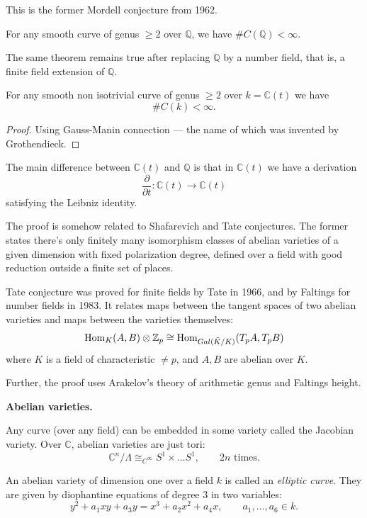 \noindent
This is the former Mordell conjecture
from 1962.

\begin{theorem}[Faltings, 1983]
For any smooth curve of genus $\geq 2$ over
$\mathbb{Q}$, we have $\#C(\mathbb{Q})<
\infty$.
\end{theorem}

The same theorem remains true after
replacing $\mathbb{Q}$ by a number field,
that is, a finite field extension of
$\mathbb{Q}$.

\begin{theorem}
\label{theorem-manin-grauer}
For any smooth non isotrivial curve of
genus $\geq 2$ over $k=\mathbb{C}(t)$
we have
$$
\# C(k) < \infty.
$$
\end{theorem}

\begin{proof}
Using Gauss-Manin connection ---
the name of which was invented by 
Grothendieck.
\end{proof}

\noindent
The main difference between
$\mathbb{C}(t)$
and $\mathbb{Q}$
is that in $\mathbb{C}(t)$
we have a derivation
$$
\frac{\partial }{\partial t}:
\mathbb{C}(t) \to \mathbb{C}(t)
$$
satisfying the Leibniz identity.

\medskip\noindent
The proof is somehow related
to Shafarevich and Tate conjectures.
The former states there's only
finitely many isomorphism
classes of abelian varieties of a
given dimension with
fixed polarization degree, defined
over a field with
good reduction outside a finite set
of places.

Tate conjecture was proved for finite
fields by Tate in 1966,
and by Faltings for number fields
in 1983.
It relates maps between the tangent
spaces of two abelian varieties
and maps between the varieties
themselves:
$$
\mathop{\mathrm{Hom}}\nolimits_K(A,B) \otimes \mathbb{Z}_p
\cong
\mathop{\mathrm{Hom}}\nolimits_{Gal(\tilde{K}/K)}
(T_pA,T_pB)
$$
where $K$ is a field of characteristic
$\neq p$, and $A,B$ are abelian over $K$.

Further, the proof uses Arakelov's
theory of arithmetic genus
and Faltings height.

\medskip\noindent
{\bf Abelian varieties.} 

Any curve (over any field)
can be embedded in some variety
called the Jacobian variety.
Over $\mathbb{C}$,
abelian varieties are just tori:
$$
\mathbb{C}^n/\Lambda
\cong_{C^\infty}
S^1\times… S^1,\qquad  2n \text{ times}.
$$

An abelian variety of dimension one
over a field $k$ is called
an {\it elliptic curve}.
They are given by diophantine
equations of degree 3 in two variables:
$$
y^2+a_1xy+a_3y
=
x^3+a_2x^2+a_4x,
\qquad a_1,…,a_6 \in k.
$$

